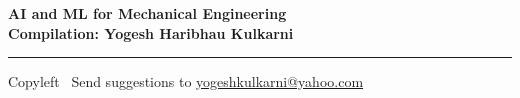 % 



% 


\graphicspath{{images/}}



\footnotesize


\begin{center}
\Large{\textbf{AI and ML for Mechanical Engineering\\ Compilation: Yogesh Haribhau Kulkarni}}  
\end{center}


\begin{multicols}{2}
	
\end{multicols}

\rule{\linewidth}{0.25pt}
\scriptsize
Copyleft \textcopyleft\  Send suggestions to 
\href{http://www.yogeshkulkarni.com}{yogeshkulkarni@yahoo.com}


